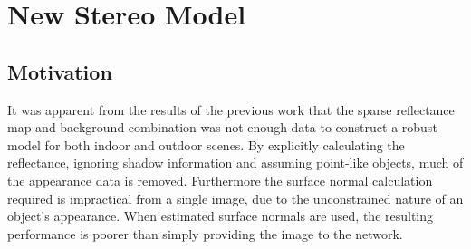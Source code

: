 \documentclass[ %
                    author={Gavin Parker},
                supervisor={Dr. Neill Campbell},
                    degree={MEng},
                     title={Deep Learning for Illumination Estimation from Stereo Images},
                  subtitle={},
                      type={Research},
                      year={2018} ]{dissertation}
\begin{document}
\chapter{New Stereo Model}
\section{Motivation}
It was apparent from the results of the previous work that the sparse reflectance map and background combination was not enough data to construct a robust model for both indoor and outdoor scenes. By explicitly calculating the reflectance, ignoring shadow information and assuming point-like objects, much of the appearance data is removed. Furthermore the surface normal calculation required is impractical from a single image, due to the unconstrained nature of an object's appearance. When estimated surface normals are used, the resulting performance is poorer than simply providing the image to the network.
\end{document}
